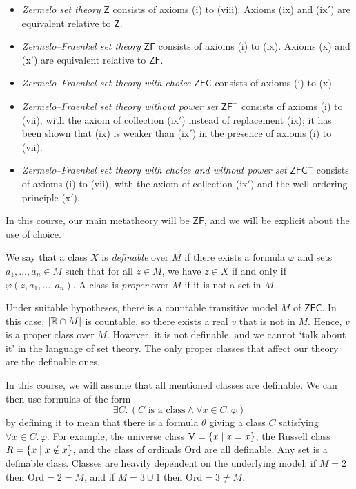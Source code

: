 \begin{itemize}
    \item \emph{Zermelo set theory} \( \mathsf{Z} \) consists of axioms (i) to (viii).
    Axioms (ix) and (ix\('\)) are equivalent relative to \( \mathsf{Z} \).
    \item \emph{Zermelo--Fraenkel set theory} \( \mathsf{ZF} \) consists of axioms (i) to (ix).
    Axioms (x) and (x\('\)) are equivalent relative to \( \mathsf{ZF} \).
    \item \emph{Zermelo--Fraenkel set theory with choice} \( \mathsf{ZFC} \) consists of axioms (i) to (x).
    \item \emph{Zermelo--Fraenkel set theory without power set} \( \mathsf{ZF}^- \) consists of axioms (i) to (vii), with the axiom of collection (ix\('\)) instead of replacement (ix); it has been shown that (ix) is weaker than (ix\('\)) in the presence of axioms (i) to (vii).
    \item \emph{Zermelo--Fraenkel set theory with choice and without power set} \( \mathsf{ZFC}^- \) consists of axioms (i) to (vii), with the axiom of collection (ix\('\)) and the well-ordering principle (x\('\)).
\end{itemize}
In this course, our main metatheory will be \( \mathsf{ZF} \), and we will be explicit about the use of choice.

We say that a class \( X \) is \emph{definable} over \( M \) if there exists a formula \( \varphi \) and sets \( a_1, \dots, a_n \in M \) such that for all \( z \in M \), we have \( z \in X \) if and only if \( \varphi(z, a_1, \dots, a_n) \).
A class is \emph{proper} over \( M \) if it is not a set in \( M \).

Under suitable hypotheses, there is a countable transitive model \( M \) of \( \mathsf{ZFC} \).
In this case, \( \abs{\mathbb R \cap M} \) is countable, so there exists a real \( v \) that is not in \( M \).
Hence, \( v \) is a proper class over \( M \).
However, it is not definable, and we cannot `talk about it' in the language of set theory.
The only proper classes that affect our theory are the definable ones.

In this course, we will assume that all mentioned classes are definable.
We can then use formulas of the form
\[ \exists C.\, (C \text{ is a class} \wedge \forall x \in C.\, \varphi) \]
by defining it to mean that there is a formula \( \theta \) giving a class \( C \) satisfying \( \forall x \in C.\, \varphi \).
For example, the universe class \( \mathrm{V} = \qty{x \mid x = x} \), the Russell class \( R = \qty{x \mid x \notin x} \), and the class of ordinals \( \mathrm{Ord} \) are all definable.
Any set is a definable class.
Classes are heavily dependent on the underlying model: if \( M = 2 \) then \( \mathrm{Ord} = 2 = M \), and if \( M = 3 \cup \qty{1} \) then \( \mathrm{Ord} = 3 \neq M \).

